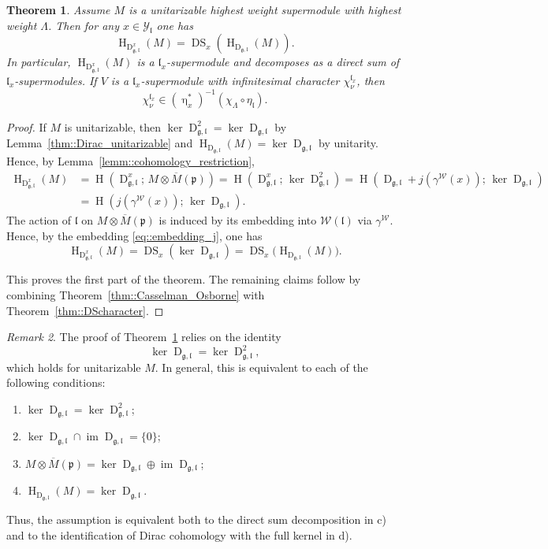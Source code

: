 \documentclass[11pt]{amsart}
\newcommand{\DS}{\operatorname{DS}}
\renewcommand{\Im}{\operatorname{im}}
\newcommand{\Dirac}{\operatorname{D}}
\def\WW{{\mathcal{W}}}
\def\pp{{\mathfrak p}}
\def\H{{\operatorname{H}}}
\def\Dx{{\operatorname{D}_{\gg,\ll}^{x}}}
\def\ll{{\mathfrak l}}
\def\YY{{\mathcal Y}}
\def\pp{{\mathfrak p}}
\def\pp{{\mathfrak{p}}}
\def\gg{{\mathfrak{g}}}
\theoremstyle{plain}
\newtheorem{theorem}{Theorem}
\theoremstyle{remark}
\theoremstyle{definition}
\numberwithin{equation}{section}
\theoremstyle{remark}
\newtheorem{remark}[theorem]{Remark}
\begin{document}
\begin{theorem} \label{thm::Dirac_and_DS}
 Assume $M$ is a unitarizable highest weight supermodule with highest weight $\Lambda$. Then for any $x \in \YY_{\ll}$ one has
 \[
 \H_{\Dx}(M)=\DS_{x}(\H_{\Dirac_{\gg,\ll}}(M)).
 \]
 In particular, $\H_{\Dx}(M)$ is a $\ll_{x}$-supermodule and decomposes as a direct sum of $\ll_{x}$-supermodules. If $V$ is a $\ll_{x}$-supermodule with infinitesimal character $\chi_{\nu}^{\ll_{x}}$, then 
 \[
 \chi_{\nu}^{\ll_{x}} \in (\upeta_{x}^{\ast})^{-1}(\chi_{\Lambda} \circ \eta_{\ll}).
 \]
\end{theorem}

\begin{proof}
 If $M$ is unitarizable, then $\ker \Dirac_{\gg,\ll}^{2}=\ker \Dirac_{\gg,\ll}$ by Lemma~\ref{thm::Dirac_unitarizable} and
$\H_{\Dirac_{\gg,\ll}}(M)=\ker \Dirac_{\gg,\ll}$ by unitarity. Hence, by
Lemma~\ref{lemm::cohomology_restriction},
\[
\begin{split}
\H_{\Dx}(M)
&=\H(\Dx;\,M\otimes \overline{M}(\pp))
=\H(\Dx;\,\ker \Dirac_{\gg,\ll}^{2})
=\H(\Dirac_{\gg,\ll}+j(\gamma^{\WW}(x));\,\ker \Dirac_{\gg,\ll})\\
&=\H(j(\gamma^{\WW}(x));\,\ker \Dirac_{\gg,\ll}).
\end{split}
\]
The action of $\ll$ on $M\otimes \overline{M}(\pp)$ is induced by its embedding into $\WW(\ll)$ via $\gamma^{\WW}$. Hence, by the embedding \eqref{eq::embedding_j}, one has
\[
\H_{\Dx}(M)=\DS_{x}(\ker \Dirac_{\gg,\ll})=\DS_{x}\bigl(\H_{\Dirac_{\gg,\ll}}(M)\bigr).
\]

This proves the first part of the theorem. The remaining claims follow by combining Theorem~\ref{thm::Casselman_Osborne} with Theorem~\ref{thm::DScharacter}.
\end{proof}

\begin{remark}
The proof of Theorem~\ref{thm::Dirac_and_DS} relies on the identity
\[
\ker \Dirac_{\gg,\ll}=\ker \Dirac_{\gg,\ll}^{2},
\]
which holds for unitarizable $M$. In general, this is equivalent to each of the following conditions:
\begin{enumerate}
 \item[(a)] $\ker \Dirac_{\gg,\ll}=\ker \Dirac_{\gg,\ll}^{2}$;
 \item[(b)] $\ker \Dirac_{\gg,\ll}\cap \Im \Dirac_{\gg,\ll}=\{0\}$;
 \item[(c)] $M\otimes \overline{M}(\pp)=\ker \Dirac_{\gg,\ll}\oplus \Im \Dirac_{\gg,\ll}$;
 \item[(d)] $\H_{\Dirac_{\gg,\ll}}(M)=\ker \Dirac_{\gg,\ll}$.
\end{enumerate}
Thus, the assumption is equivalent both to the direct sum decomposition in \textup{c)} and to the identification of Dirac cohomology with the full kernel in \textup{d)}.
\end{remark}
\end{document}
